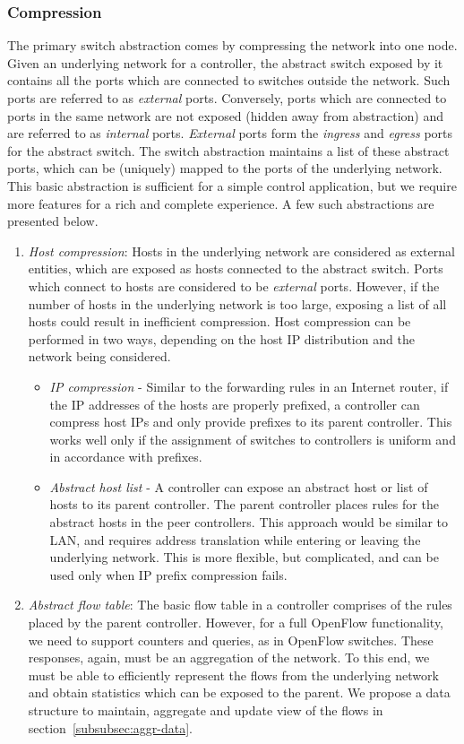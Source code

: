 \documentclass[10pt, twocolumn]{article}
\begin{document}
\subsubsection{Compression}
The primary switch abstraction comes by compressing the network into one node. Given an underlying network for a controller, the abstract switch exposed by it contains all the ports which are connected to switches outside the network. Such ports are referred to as \emph{external} ports. Conversely, ports which are connected to ports in the same network are not exposed (hidden away from abstraction) and are referred to as \emph{internal} ports. \emph{External} ports form the \emph{ingress} and \emph{egress} ports for the abstract switch. The switch abstraction maintains a list of these abstract ports, which can be (uniquely) mapped to the ports of the underlying network. This basic abstraction is sufficient for a simple control application, but we require more features for a rich and complete experience. A few such abstractions are presented below.
\begin{enumerate}
    \item \emph{Host compression}:
    Hosts in the underlying network are considered as external entities, which are exposed as hosts connected to the abstract switch. Ports which connect to hosts are considered to be \emph{external} ports. However, if the number of hosts in the underlying network is too large, exposing a list of all hosts could result in inefficient compression. Host compression can be performed in two ways, depending on the host IP distribution and the network being considered.
    \begin{itemize}
        \item \emph{IP compression} -
        Similar to the forwarding rules in an Internet router, if the IP addresses of the hosts are properly prefixed, a controller can compress host IPs and only provide prefixes to its parent controller. This works well only if the assignment of switches to controllers is uniform and in accordance with prefixes.
        \item \emph{Abstract host list} -
        A controller can expose an abstract host or list of hosts to its parent controller. The parent controller places rules for the abstract hosts in the peer controllers. This approach would be similar to LAN, and requires address translation while entering or leaving the underlying network. This is more flexible, but complicated, and can be used only when IP prefix compression fails.
    \end{itemize}
    \item \emph{Abstract flow table}:
        The basic flow table in a controller comprises of the rules placed by the parent controller. However, for a full OpenFlow functionality, we need to support counters and queries, as in OpenFlow switches. These responses, again, must be an aggregation of the network. To this end, we must be able to efficiently represent the flows from the underlying network and obtain statistics which can be exposed to the parent. We propose a data structure to maintain, aggregate and update view of the flows in section~\ref{subsubsec:aggr-data}.
\end{enumerate}
\end{document}
